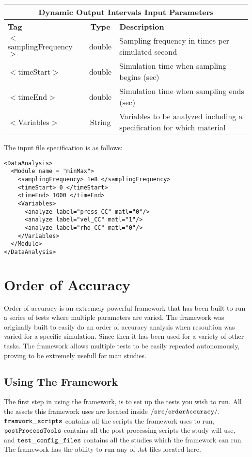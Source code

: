 \begin{center}
\begin{tabular}{| l | c | p{7cm} |}
\hline
  \multicolumn{3}{|c|}{\textbf{Dynamic Output Intervals Input Parameters}} \\
\hline
\hline
  \textbf{Tag} & \textbf{Type} & \textbf{Description}\\
\hline
  $<$samplingFrequency$>$ & double & Sampling frequency in times per simulated second\\
\hline
  $<$timeStart$>$ & double & Simulation time when sampling begins (sec)\\
\hline
  $<$timeEnd$>$ & double & Simulation time when sampling ends (sec)\\
\hline
  $<$Variables$>$ & String & Variables to be analyzed including a specification for which material\\
\hline
\end{tabular}
\end{center}


The input file specification is as follows:
\begin{verbatim}
<DataAnalysis>
  <Module name = "minMax">
    <samplingFrequency> 1e8 </samplingFrequency>
    <timeStart> 0 </timeStart>
    <timeEnd> 1000 </timeEnd>
    <Variables>
      <analyze label="press_CC" matl="0"/>
      <analyze label="vel_CC" matl="1"/>
      <analyze label="rho_CC" matl="0"/>
    </Variables>
  </Module>
</DataAnalysis>
\end{verbatim}

\chapter{Order of Accuracy}
\label{chap:OA}

Order of accuracy is an extremely powerful framework that has been built to run a series of tests where multiple parameters are varied. The framework was originally built to easily do an order of accuracy analysis when resoultion was varied for a specific simulation. Since then it has been used for a variety of other tasks. The framework allows multiple tests to be easily repeated autonomously, proving to be extremely usefull for man studies.

\section{Using The Framework}

The first step in using the framework, is to set up the tests you wish to run. All the assets this framework uses are located inside $\TT{/src/orderAccuracy/}$. $\TT{framwork\_scripts}$ contains all the scripts the framework uses to run, $\TT{postProcessTools}$ contains all the post processing scripts the study will use, and $\TT{test\_config\_files}$ contains all the studies which the framework can run. The framework has the ability to run any of .tst files located here. \\

